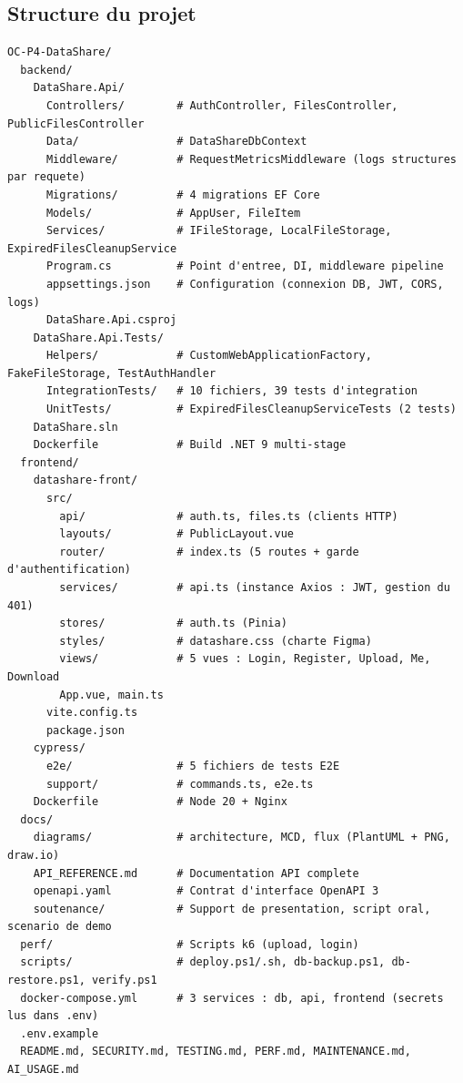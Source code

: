 \documentclass[12pt,a4paper]{article}
\begin{document}
\subsection{Structure du projet}

\begin{lstlisting}[title={Arborescence du projet}]
OC-P4-DataShare/
  backend/
    DataShare.Api/
      Controllers/        # AuthController, FilesController, PublicFilesController
      Data/               # DataShareDbContext
      Middleware/         # RequestMetricsMiddleware (logs structures par requete)
      Migrations/         # 4 migrations EF Core
      Models/             # AppUser, FileItem
      Services/           # IFileStorage, LocalFileStorage, ExpiredFilesCleanupService
      Program.cs          # Point d'entree, DI, middleware pipeline
      appsettings.json    # Configuration (connexion DB, JWT, CORS, logs)
      DataShare.Api.csproj
    DataShare.Api.Tests/
      Helpers/            # CustomWebApplicationFactory, FakeFileStorage, TestAuthHandler
      IntegrationTests/   # 10 fichiers, 39 tests d'integration
      UnitTests/          # ExpiredFilesCleanupServiceTests (2 tests)
    DataShare.sln
    Dockerfile            # Build .NET 9 multi-stage
  frontend/
    datashare-front/
      src/
        api/              # auth.ts, files.ts (clients HTTP)
        layouts/          # PublicLayout.vue
        router/           # index.ts (5 routes + garde d'authentification)
        services/         # api.ts (instance Axios : JWT, gestion du 401)
        stores/           # auth.ts (Pinia)
        styles/           # datashare.css (charte Figma)
        views/            # 5 vues : Login, Register, Upload, Me, Download
        App.vue, main.ts
      vite.config.ts
      package.json
    cypress/
      e2e/                # 5 fichiers de tests E2E
      support/            # commands.ts, e2e.ts
    Dockerfile            # Node 20 + Nginx
  docs/
    diagrams/             # architecture, MCD, flux (PlantUML + PNG, draw.io)
    API_REFERENCE.md      # Documentation API complete
    openapi.yaml          # Contrat d'interface OpenAPI 3
    soutenance/           # Support de presentation, script oral, scenario de demo
  perf/                   # Scripts k6 (upload, login)
  scripts/                # deploy.ps1/.sh, db-backup.ps1, db-restore.ps1, verify.ps1
  docker-compose.yml      # 3 services : db, api, frontend (secrets lus dans .env)
  .env.example
  README.md, SECURITY.md, TESTING.md, PERF.md, MAINTENANCE.md, AI_USAGE.md
\end{lstlisting}
\end{document}

